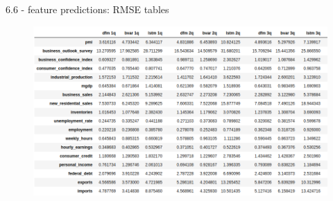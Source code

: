 \begin{frame}{6.6 - feature predictions: RMSE tables}
\begin{figure}[h]
	\centering
	\includegraphics[width=1\linewidth]{im5}
\end{figure}
\end{frame}












